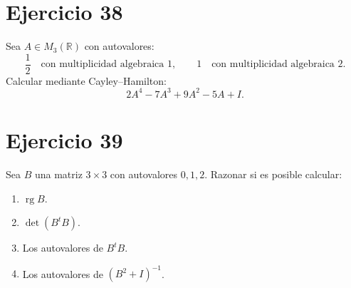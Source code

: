 \documentclass[11pt,a4paper]{article}
\newcommand{\R}{\mathbb{R}}
\newcommand{\rg}{\operatorname{rg}}
\begin{document}
\section{Ejercicio 38}
Sea $A\in M_3(\R)$ con autovalores:
\[
\frac12\quad\text{con multiplicidad algebraica }1,
\qquad
1\quad\text{con multiplicidad algebraica }2.
\]
Calcular mediante Cayley--Hamilton:
\[
2A^4-7A^3+9A^2-5A+I.
\]

\section{Ejercicio 39}
Sea $B$ una matriz $3\times3$ con autovalores $0,1,2$. Razonar si es posible calcular:
\begin{enumerate}[label=\alph*)]
\item $\rg B$.
\item $\det(B^tB)$.
\item Los autovalores de $B^tB$.
\item Los autovalores de $(B^2+I)^{-1}$.
\end{enumerate}
\end{document}
